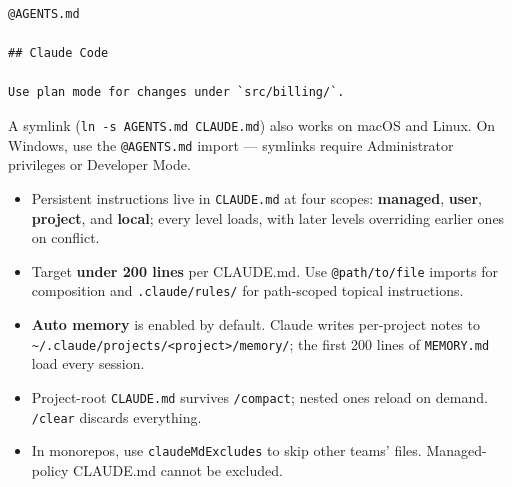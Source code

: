 \begin{lstlisting}[caption={Sharing instructions between agents}]
@AGENTS.md

## Claude Code

Use plan mode for changes under `src/billing/`.
\end{lstlisting}

A symlink (\texttt{ln -s AGENTS.md CLAUDE.md}) also works on macOS and
Linux. On Windows, use the \texttt{@AGENTS.md} import — symlinks require
Administrator privileges or Developer Mode.

\begin{summarybox}
\begin{itemize}
  \item Persistent instructions live in \texttt{CLAUDE.md} at four scopes:
        \textbf{managed}, \textbf{user}, \textbf{project}, and \textbf{local};
        every level loads, with later levels overriding earlier ones on
        conflict.
  \item Target \textbf{under 200 lines} per CLAUDE.md. Use
        \texttt{@path/to/file} imports for composition and
        \texttt{.claude/rules/} for path-scoped topical instructions.
  \item \textbf{Auto memory} is enabled by default. Claude writes per-project
        notes to
        \texttt{\textasciitilde/.claude/projects/<project>/memory/}; the first
        200 lines of \texttt{MEMORY.md} load every session.
  \item Project-root \texttt{CLAUDE.md} survives \texttt{/compact};
        nested ones reload on demand. \texttt{/clear} discards everything.
  \item In monorepos, use \texttt{claudeMdExcludes} to skip other teams'
        files. Managed-policy CLAUDE.md cannot be excluded.
\end{itemize}
\end{summarybox}

\nocite{*}
\printbibliography[heading=subbibliography,title={References}]
